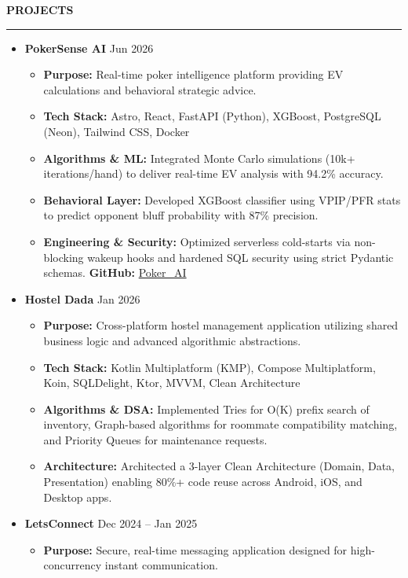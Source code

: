 \documentclass[10pt]{article}
\newcommand{\resheading}[1]{\vspace{6pt} \noindent \textbf{\large\scshape{#1}} \vspace{3pt} \hrule \vspace{4pt}}
\begin{document}
\resheading{PROJECTS}
\begin{itemize}
\item \textbf{PokerSense AI} \hfill Jun 2026
    \begin{itemize}[noitemsep]
        \item \textbf{Purpose:} Real-time poker intelligence platform providing EV calculations and behavioral strategic advice.
        \item \textbf{Tech Stack:} Astro, React, FastAPI (Python), XGBoost, PostgreSQL (Neon), Tailwind CSS, Docker
        \item \textbf{Algorithms \& ML:} Integrated Monte Carlo simulations (10k+ iterations/hand) to deliver real-time EV analysis with 94.2\% accuracy.
        \item \textbf{Behavioral Layer:} Developed XGBoost classifier using VPIP/PFR stats to predict opponent bluff probability with 87\% precision.
        \item \textbf{Engineering \& Security:} Optimized serverless cold-starts via non-blocking wakeup hooks and hardened SQL security using strict Pydantic schemas. \textbf{GitHub:} \href{https://github.com/DushyantBhardwaj2/Poker_AI}{Poker\_AI}
    \end{itemize}
\item \textbf{Hostel Dada} \hfill Jan 2026
    \begin{itemize}[noitemsep]
        \item \textbf{Purpose:} Cross-platform hostel management application utilizing shared business logic and advanced algorithmic abstractions.
        \item \textbf{Tech Stack:} Kotlin Multiplatform (KMP), Compose Multiplatform, Koin, SQLDelight, Ktor, MVVM, Clean Architecture
        \item \textbf{Algorithms \& DSA:} Implemented Tries for O(K) prefix search of inventory, Graph-based algorithms for roommate compatibility matching, and Priority Queues for maintenance requests.
        \item \textbf{Architecture:} Architected a 3-layer Clean Architecture (Domain, Data, Presentation) enabling 80\%+ code reuse across Android, iOS, and Desktop apps.
    \end{itemize}
\item \textbf{LetsConnect} \hfill Dec 2024 -- Jan 2025
    \begin{itemize}[noitemsep]
        \item \textbf{Purpose:} Secure, real-time messaging application designed for high-concurrency instant communication.

\end{itemize}
\end{itemize}
\end{document}

